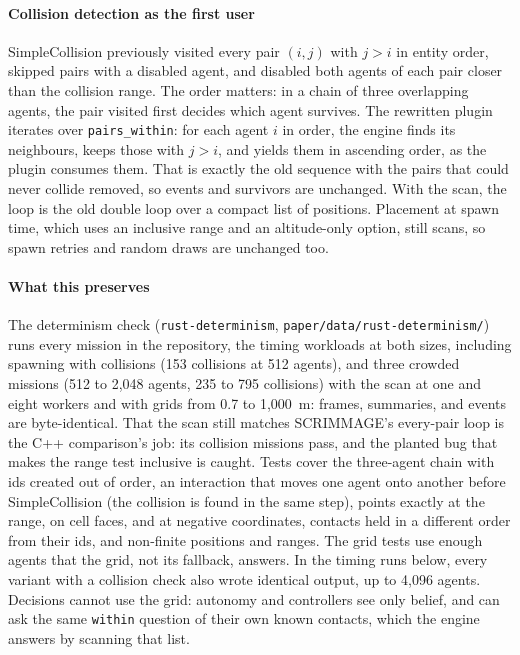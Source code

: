 \documentclass[conference]{IEEEtran}
\begin{document}
\paragraph{Collision detection as the first user}
SimpleCollision previously visited every pair $(i, j)$ with $j > i$ in entity
order, skipped pairs with a disabled agent, and disabled both agents of each
pair closer than the collision range. The order matters: in a chain of three
overlapping agents, the pair visited first decides which agent survives. The
rewritten plugin iterates over \texttt{pairs\_within}: for each agent $i$ in
order, the engine finds its neighbours, keeps those with $j > i$, and yields
them in ascending order, as the plugin consumes them. That is exactly the old
sequence with the pairs that could never collide removed, so events and
survivors are unchanged. With the scan, the loop is the old double loop over a
compact list of positions. Placement at spawn time, which uses an
inclusive range and an altitude-only option, still scans, so spawn retries and
random draws are unchanged too.

\paragraph{What this preserves}
The determinism check (\texttt{rust-determinism},
\texttt{paper/data/rust-determinism/}) runs every mission in the repository,
the timing workloads at both sizes, including spawning with collisions
(153 collisions at 512 agents), and three crowded missions (512
to 2{,}048 agents, 235 to 795 collisions) with the scan at one and
eight workers and with grids from 0.7 to 1{,}000~m: frames, summaries, and
events are byte-identical. That the scan still matches SCRIMMAGE's every-pair
loop is the C++ comparison's job: its collision missions pass, and the planted
bug that makes the range test inclusive is caught. Tests cover the three-agent
chain
with ids created out of order, an interaction that moves one agent onto another
before SimpleCollision (the collision is found in the same step), points
exactly at the range, on cell faces, and at negative coordinates, contacts held
in a different order from their ids, and non-finite positions and ranges. The
grid tests use enough agents that the grid, not its fallback, answers. In the
timing runs below, every variant with a collision check also wrote identical
output, up to 4{,}096 agents.
Decisions cannot use the grid: autonomy and controllers see only belief, and
can ask the same \texttt{within} question of their own known contacts, which
the engine answers by scanning that list.
\end{document}
